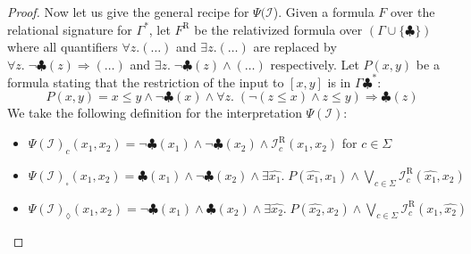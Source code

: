 \documentclass{fundam}
\newcommand{\cI}{\mathcal{I}}
\newcommand{\relat}{\mathrm{R}}
\theoremstyle{claimstyle}
\begin{document}
\begin{proof}
  Now let us give the general recipe for $\Psi(\cI$).
  Given a formula $F$ over the relational signature for $\Gamma^*$, let $F^\relat$ be the relativized formula over $(\Gamma\cup\{\clubsuit\})$ where all
    quantifiers $\forall z.(\dots)$ and $\exists z.(\dots)$ are replaced by $\forall z.\; \lnot\clubsuit(z) \Rightarrow (\dots)$ and $\exists z.\;
    \lnot\clubsuit(z) \land (\dots)$ respectively. Let $P(x,y)$ be a formula stating that
    the restriction of the input to $[x,y]$ is in $\Gamma \clubsuit^*$:
  \[ P(x,y) = x \leq y \land \lnot\clubsuit(x) \land \forall z.\; (\lnot(z \leq x) \land z \leq y) \Rightarrow \clubsuit(z) \]
  We take the following definition for the interpretation $\Psi(\cI)$: 
  \begin{itemize}
    \item $\Psi(\cI)_c(x_1,x_2) = \lnot\clubsuit(x_1)\land\lnot\clubsuit(x_2)\land\cI_c^\relat(x_1,x_2)$ for $c\in\Sigma$
    \item $\Psi(\cI)_\square(x_1,x_2) = \clubsuit(x_1)\land\lnot\clubsuit(x_2)\land \exists \widehat{x_1}.\; P(\widehat{x_1},x_1) \land \displaystyle\bigvee_{c\in\Sigma} \cI_c^\relat(\widehat{x_1},x_2)$
    \item $\Psi(\cI)_\lozenge(x_1,x_2) = \lnot\clubsuit(x_1)\land\clubsuit(x_2)\land \exists \widehat{x_2}.\; P(\widehat{x_2},x_2) \land \displaystyle\bigvee_{c\in\Sigma} \cI_c^\relat(x_1,\widehat{x_2})$

\end{itemize}
\end{proof}
\end{document}
